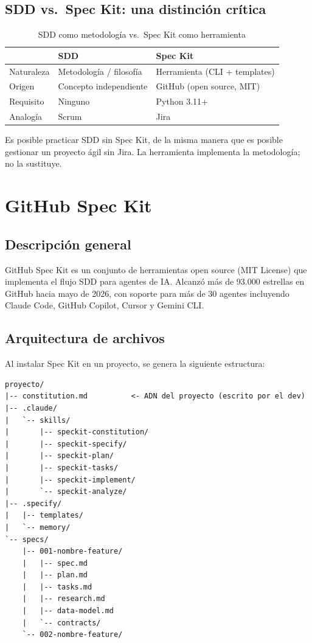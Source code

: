 \documentclass[12pt, a4paper]{report}
\begin{document}
\section{SDD vs.\ Spec Kit: una distinci\'on cr\'itica}

\begin{table}[H]
\centering
\begin{tabularx}{\textwidth}{lXX}
\toprule
& \textbf{SDD} & \textbf{Spec Kit} \\
\midrule
Naturaleza & Metodolog\'ia / filosof\'ia & Herramienta (CLI + templates) \\
Origen     & Concepto independiente & GitHub (open source, MIT) \\
Requisito  & Ninguno & Python 3.11+ \\
Analog\'ia & Scrum & Jira \\
\bottomrule
\end{tabularx}
\caption{SDD como metodolog\'ia vs.\ Spec Kit como herramienta}
\end{table}

Es posible practicar SDD sin Spec Kit, de la misma manera que es posible
gestionar un proyecto \'agil sin Jira. La herramienta implementa la
metodolog\'ia; no la sustituye.

\chapter{GitHub Spec Kit}

\section{Descripci\'on general}

GitHub Spec Kit es un conjunto de herramientas open source (MIT License)
que implementa el flujo SDD para agentes de IA. Alcanz\'o m\'as de 93.000
estrellas en GitHub hacia mayo de 2026, con soporte para m\'as de 30 agentes
incluyendo Claude Code, GitHub Copilot, Cursor y Gemini CLI.

\section{Arquitectura de archivos}

Al instalar Spec Kit en un proyecto, se genera la siguiente estructura:

\begin{lstlisting}
proyecto/
|-- constitution.md          <- ADN del proyecto (escrito por el dev)
|-- .claude/
|   `-- skills/
|       |-- speckit-constitution/
|       |-- speckit-specify/
|       |-- speckit-plan/
|       |-- speckit-tasks/
|       |-- speckit-implement/
|       `-- speckit-analyze/
|-- .specify/
|   |-- templates/
|   `-- memory/
`-- specs/
    |-- 001-nombre-feature/
    |   |-- spec.md
    |   |-- plan.md
    |   |-- tasks.md
    |   |-- research.md
    |   |-- data-model.md
    |   `-- contracts/
    `-- 002-nombre-feature/
\end{lstlisting}
\end{document}
